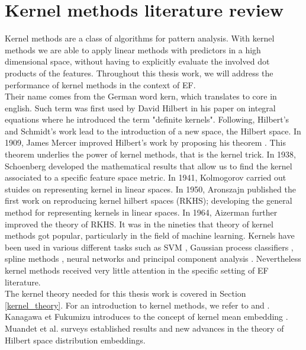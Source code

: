 \section{Kernel methods literature review}
Kernel methods are a class of algorithms for pattern analysis.
With kernel methods we are able to apply linear methods with predictors in a high dimensional space, without having to explicitly evaluate the involved dot products of the features.
Throughout this thesis work, we will address the performance of kernel methods in the context of EF.
\\
Their name comes from the German word kern, which translates to core in english. Such term was first used by David Hilbert in his paper on integral equations \cite{hilbert} where he introduced the term "definite kernels". Following, Hilbert's and Schmidt's work \cite{schmidt} lead to the introduction of a new space, the Hilbert space.
In 1909, James Mercer improved Hilbert's work by proposing his theorem \cite{mercer}. This theorem underlies the power of kernel methods, that is the kernel trick.
In 1938, Schoenberg \cite{schoenberg} developed the mathematical results that allow us to find the kernel associated to a specific feature space metric.
In 1941, Kolmogorov \cite{kolmogorov} carried out stuides on representing kernel in linear spaces.
In 1950, Aronszajn \cite{aronszajn} published the first work on reproducing kernel hilbert spaces (RKHS); developing the general method for representing kernels in linear spaces.
In 1964, Aizerman \cite{aizerman} further improved the theory of RKHS.
It was in the nineties that theory of kernel methods got popular, particularly in the field of machine learning. Kernels have been used in various different tasks such as SVM \cite{vapnik1} \cite{vapnik2}, Gaussian process classifiers \cite{williams}, spline methods \cite{wahba}, neural networks \cite{poggio} and principal component analysis \cite{pca_scholkopf}.
Nevertheless kernel methods received very little attention in the specific setting of EF literature.
\\
The kernel theory needed for this thesis work is covered in Section \ref{kernel_theory}. 
For an introduction to kernel methods, we refer to \cite{learning_with_kernels, hofmann2006review} and \cite{shawe2004kernel}.
\\
Kanagawa et Fukumizu introduces to the concept of kernel mean embedding \cite{pmlr}. Muandet et al. \cite{Muandet_2017} surveys established results and new advances in the theory of Hilbert space distribution embeddings. 
